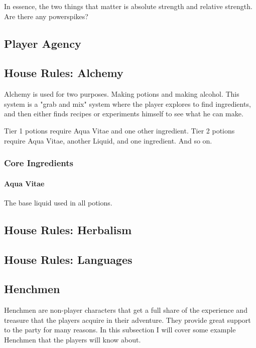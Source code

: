 \begin{multicols}{2}
In essence, the two things that matter is absolute strength and relative strength. Are there any powerspikes?
 
\subsection{Player Agency} 

\subsection{House Rules: Alchemy}
Alchemy is used for two purposes. Making potions and making alcohol. This system is a "grab and mix" system where the player explores to find ingredients, and then either finds recipes or experiments himself to see what he can make.

Tier 1 potions require Aqua Vitae and one other ingredient. Tier 2 potions require Aqua Vitae, another Liquid, and one ingredient. And so on. 



% 

    \subsubsection{Core Ingredients}
        \paragraph{Aqua Vitae} The base liquid used in all potions. 
\subsection{House Rules: Herbalism}
\subsection{House Rules: Languages}

\subsection{Henchmen}
Henchmen are non-player characters that get a full share of the experience and treasure that the players acquire in their adventure. They provide great support to the party for many reasons. In this subsection I will cover some example Henchmen that the players will know about.


\end{multicols}
